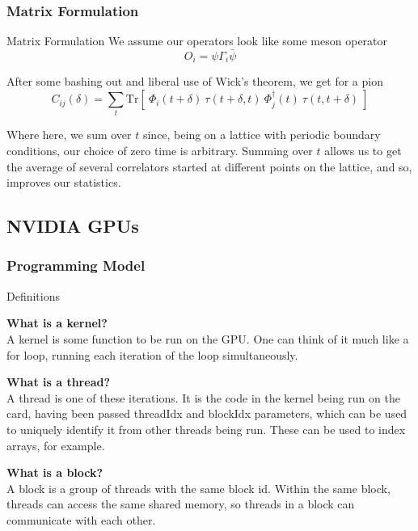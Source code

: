 \documentclass[xcolor=svgnames]{beamer}
\newcommand{\tr}[1]{\textrm{Tr}\left[ #1 \right]}
\begin{document}
\subsubsection{Matrix Formulation}

\begin{frame}{Matrix Formulation}
We assume our operators look like some meson operator
%
\begin{equation*}
O_i = \psi \Gamma_i \bar{\psi}
\end{equation*}

After some bashing out and liberal use of Wick's theorem, we get for a pion
%
\begin{equation*}
C_{ij}(\delta) = \sum_t \tr{\ \Phi_i(t+\delta)\ \tau(t+\delta, t)\ \Phi^\dagger_j(t)\ \tau(t, t+\delta)\ }
\end{equation*}

Where here, we sum over $t$ since, being on a lattice with periodic boundary conditions, our choice of zero time is arbitrary. Summing over $t$ allows us to get the average of several correlators started at different points on the lattice, and so, improves our statistics.
\end{frame}


\subsection{NVIDIA GPUs}

\subsubsection{Programming Model}

\begin{frame}{Definitions}

{\bf What is a kernel?\\}
A kernel is some function to be run on the GPU. One can think of it much like a for loop, running each iteration of the loop simultaneously.

\vspace{1em}

{\bf What is a thread?\\}
A thread is one of these iterations. It is the code in the kernel being run on the card, having been passed threadIdx and blockIdx parameters, which can be used to uniquely identify it from other threads being run. These can be used to index arrays, for example.

\vspace{1em}

{\bf What is a block?\\}
A block is a group of threads with the same block id. Within the same block, threads can access the same shared memory, so threads in a block can communicate with each other.
\end{frame}
\end{document}
